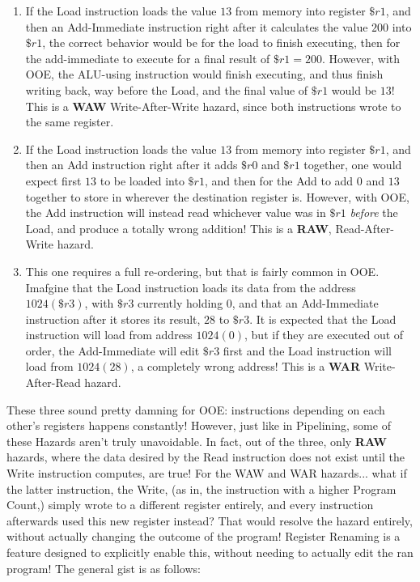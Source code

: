 \documentclass[12pt,twoside]{reedthesis}
\begin{document}
\begin{enumerate}
	\item If the Load instruction loads the value $13$ from memory into register $\$r1$, and then an Add-Immediate instruction right after it calculates the value $200$ into $\$r1$, the correct behavior would be for the load to finish executing, then for the add-immediate to execute for a final result of $\$r1 = 200$. However, with OOE, the ALU-using instruction would finish executing, and thus finish writing back, way before the Load, and the final value of $\$r1$ would be $13$! This is a \textbf{WAW} Write-After-Write hazard, since both instructions wrote to the same register.

	\item If the Load instruction loads the value $13$ from memory into register $\$r1$, and then an Add instruction right after it adds $\$r0$ and $\$r1$ together, one would expect first $13$ to be loaded into $\$r1$, and then for the Add to add $0$ and $13$ together to store in wherever the destination register is. However, with OOE, the Add instruction will instead read whichever value was in $\$r1$ \textit{before} the Load, and produce a totally wrong addition! This is a \textbf{RAW}, Read-After-Write hazard.

	\item This one requires a full re-ordering, but that is fairly common in OOE. Imafgine that the Load instruction loads its data from the address $1024(\$r3)$, with $\$r3$ currently holding 0, and that an Add-Immediate instruction after it stores its result,  $28$ to $\$r3$. It is expected that the Load instruction will load from address $1024(0)$, but if they are executed out of order, the Add-Immediate will edit $\$r3$ first and the Load instruction will load from $1024(28)$, a completely wrong address! This is a \textbf{WAR} Write-After-Read hazard.

\end{enumerate}


These three sound pretty damning for OOE: instructions depending on each other's registers happens constantly! However, just like in Pipelining, some of these Hazards aren't truly unavoidable. In fact, out of the three, only \textbf{RAW} hazards, where the data desired by the Read instruction does not exist until the Write instruction computes, are true! For the WAW and WAR hazards... what if the latter instruction, the Write, (as in, the instruction with a higher Program Count,) simply wrote to a different register entirely, and every instruction afterwards used this new register instead? That would resolve the hazard entirely, without actually changing the outcome of the program! Register Renaming is a feature designed to explicitly enable this, without needing to actually edit the ran program! The general gist is as follows:
\end{document}
